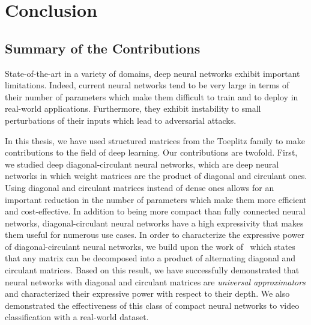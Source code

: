 \chapter{Conclusion}
\label{chapter:ch6-conclusion}
\localtoc

\section{Summary of the Contributions}
\label{section:ch6-summary_of_the_contributions}


State-of-the-art in a variety of domains, deep neural networks exhibit important limitations.
Indeed, current neural networks tend to be very large in terms of their number of parameters which make them difficult to train and to deploy in real-world applications.
Furthermore, they exhibit instability to small perturbations of their inputs which lead to adversarial attacks. 

In this thesis, we have used structured matrices from the Toeplitz family to make contributions to the field of deep learning.
Our contributions are twofold.
First, we studied deep diagonal-circulant neural networks, which are deep neural networks in which weight matrices are the product of diagonal and circulant ones.
Using diagonal and circulant matrices instead of dense ones allows for an important reduction in the number of parameters which make them more efficient and cost-effective.
In addition to being more compact than fully connected neural networks, diagonal-circulant neural networks have a high expressivity that makes them useful for numerous use cases.
In order to characterize the expressive power of diagonal-circulant neural networks, we build upon the work of~\citet{huhtanen2015factoring} which states that any matrix can be decomposed into a product of alternating diagonal and circulant matrices.
Based on this result, we have successfully demonstrated that neural networks with diagonal and circulant matrices are \emph{universal approximators} and characterized their expressive power with respect to their depth.
We also demonstrated the effectiveness of this class of compact neural networks to video classification with a real-world dataset.


